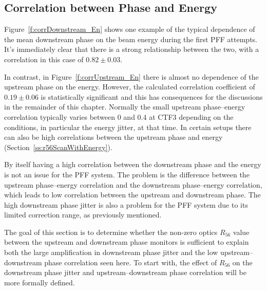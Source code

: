 \subsection{Correlation between Phase and Energy}
\label{ss:corrPhaseEnergy}

Figure~\ref{f:corrDownstream_En} shows one example of the typical dependence of the mean downstream phase on the beam energy during the first PFF attempts. It's immediately clear that there is a strong relationship between the two, with a correlation in this case of \(0.82\pm0.03\). 

In contrast, in Figure~\ref{f:corrUpstream_En} there is almost no dependence of the upstream phase on the energy. However, the calculated correlation coefficient of \(0.19\pm0.06\) is statistically significant and this has consequences for the discussions in the remainder of this chapter. Normally the small upstream phase--energy correlation typically varies between 0 and 0.4 at CTF3 depending on the conditions, in particular the energy jitter, at that time. In certain setups there can also be high correlations between the upstream phase and energy (Section~\ref{ss:r56ScanWithEnergy}).

By itself having a high correlation between the downstream phase and the energy is not an issue for the PFF system. The problem is the difference between the upstream phase--energy correlation and the downstream phase--energy correlation, which leads to low correlation between the upstream and downstream phase. The high downstream phase jitter is also a problem for the PFF system due to its limited correction range, as previously mentioned.

The goal of this section is to determine whether the non-zero optics \(R_{56}\) value between the upstream and downstream phase monitors is sufficient to explain both the large amplification in downstream phase jitter and the low upstream--downstream phase correlation seen here. To start with, the effect of \(R_{56}\) on the downstream phase jitter and upstream--downstream phase correlation will be more formally defined.

